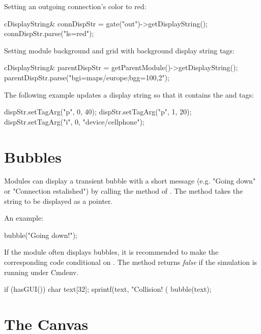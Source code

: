 Setting an outgoing connection's color to red:

\begin{cpp}
cDisplayString& connDispStr = gate("out")->getDisplayString();
connDispStr.parse("ls=red");
\end{cpp}

Setting module background and grid with background display string tags:

\begin{cpp}
cDisplayString& parentDispStr = getParentModule()->getDisplayString();
parentDispStr.parse("bgi=maps/europe;bgg=100,2");
\end{cpp}

The following example updates a display string so that it contains
the  and  tags:

\begin{cpp}
dispStr.setTagArg("p", 0, 40);
dispStr.setTagArg("p", 1, 20);
dispStr.setTagArg("i", 0, "device/cellphone");
\end{cpp}

\section{Bubbles}
\label{sec:graphics:bubbles}

Modules can display a transient bubble with a short message (e.g. "Going
down" or "Connection estalished") by calling the  method of
. The method takes the string to be displayed as a
 pointer.

An example:
\begin{cpp}
bubble("Going down!");
\end{cpp}

\begin{center}
\end{center}

If the module often displays bubbles, it is recommended to make the
corresponding code conditional on . The 
method returns \textit{false} if the simulation is running under Cmdenv.

\begin{cpp}
if (hasGUI()) {
    char text[32];
    sprintf(text, "Collision! (%
    bubble(text);
}
\end{cpp}



\section{The Canvas}
\label{sec:graphics:canvas}

